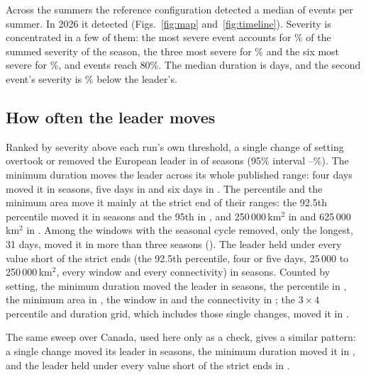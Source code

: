 \documentclass{amsdraft}
\begin{document}
Across the \NSummers{} summers the reference configuration detected a median
of \NEventsMedian{} events per summer. In 2026 it detected
\NEventsTwentySix{} (Figs.~\ref{fig:map} and~\ref{fig:timeline}). Severity is
concentrated in a few of them: the most severe event accounts for
\TopOneShareTwentySix{}\% of the summed severity of the season, the three most
severe for \TopThreeShareTwentySix{}\% and the six most severe for
\TopSixShareTwentySix{}\%, and \NForEightyTwentySix{} events reach 80\%. The
median duration is \MedianDurationTwentySix{} days, and the second event's
severity is \LeadTwentySix{}\% below the leader's.

\subsection{How often the leader moves}
\label{sec:sens}

Ranked by severity above each run's own threshold, a single change of
setting overtook or removed the European leader in \NLeaderMoved{} of
\NSummers{} seasons (95\% interval \LeaderMovedLo{}--\LeaderMovedHi{}\%).
The minimum duration moves the leader across its whole published range:
four days moved it in \NMovedDaysFour{} seasons, five days in
\NMovedDaysFive{} and six days in \NMovedStrictDays{}. The percentile and the
minimum area move it mainly at the strict end of their ranges: the 92.5th
percentile moved it in \NMovedMildPct{} seasons and the 95th in
\NMovedStrictPct{}, and 250\,000\,km$^2$ in \NMovedMildArea{} and
625\,000\,km$^2$ in \NMovedStrictArea{}. Among the windows with the seasonal
cycle removed, only the longest, 31 days, moved it in more than three
seasons (\NMovedWindowLong{}). The leader held under every value short of the
strict ends (the 92.5th percentile, four or five days, 25\,000 to
250\,000\,km$^2$, every window and every connectivity) in \NHeldAllMild{}
seasons. Counted by
setting, the minimum duration moved the leader in \NMovedDays{} seasons, the
percentile in \NMovedPercentile{}, the minimum area in \NMovedArea{}, the
window in \NMovedWindow{} and the connectivity in \NMovedConnectivity{}; the
$3 \times 4$ percentile and duration grid, which includes those single
changes, moved it in \NMovedGrid{}.

The same sweep over Canada, used here only as a check, gives a similar
pattern: a single change moved its leader in \NLeaderMovedCanada{} seasons,
the minimum duration moved it in \NMovedDaysCanada{}, and the leader held
under every value short of the strict ends in \NHeldAllMildCanada{}.
\end{document}
